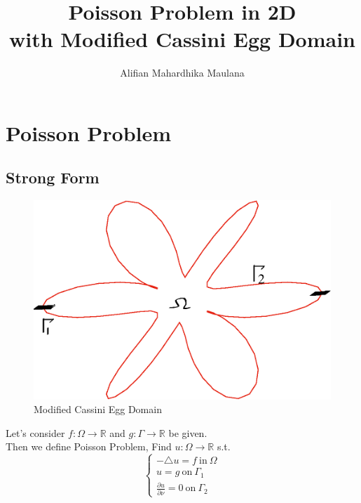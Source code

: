 \documentclass[a4paper,12pt]{article}
\title{Poisson Problem in 2D\\with Modified Cassini Egg Domain}
\author{Alifian Mahardhika Maulana}
\newcommand{\R}{\mathbb{R}}
\begin{document}
\maketitle
\section{Poisson Problem}
\subsection{Strong Form}
\begin{figure}[h!]
	\centering
	\includegraphics[width=0.5\linewidth]{picture/boundary}
	\caption{Modified Cassini Egg Domain}
	\label{fig:domain}
\end{figure}
Let's consider $f:\Omega \rightarrow \R$ and $g:\Gamma \rightarrow \R$ be given.\\
Then we define Poisson Problem, Find $u:\Omega \rightarrow \R$ s.t.
\begin{equation}\label{eq:poisson}
\begin{cases}
-\triangle u = f\ \text{in}\ \Omega\\
u = g\ \text{on}\ \Gamma_1\\
\frac{\partial u}{\partial \nu} = 0\ \text{on}\ \Gamma_2
\end{cases}
\end{equation}
\end{document}
